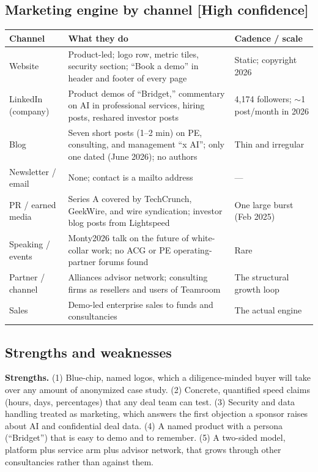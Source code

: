 \documentclass[11pt]{article}
\newcommand{\high}{\textcolor{green!45!black}{\textbf{[High confidence]}}}
\begin{document}
\subsection{Marketing engine by channel \high}
\begin{center}
\renewcommand{\arraystretch}{1.25}
\small
\begin{tabular}{R{2.6cm} R{6.4cm} R{4.2cm}}
\toprule
\textbf{Channel} & \textbf{What they do} & \textbf{Cadence / scale} \\
\midrule
Website & Product-led; logo row, metric tiles, security section; ``Book a demo'' in
header and footer of every page & Static; copyright 2026 \\
LinkedIn (company) & Product demos of ``Bridget,'' commentary on AI in professional
services, hiring posts, reshared investor posts & 4,174 followers; $\sim$1 post/month
in 2026 \\
Blog & Seven short posts (1--2 min) on PE, consulting, and management ``x AI''; only one
dated (June 2026); no authors & Thin and irregular \\
Newsletter / email & None; contact is a mailto address & --- \\
PR / earned media & Series A covered by TechCrunch, GeekWire, and wire syndication;
investor blog posts from Lightspeed & One large burst (Feb 2025) \\
Speaking / events & Monty2026 talk on the future of white-collar work; no ACG or PE
operating-partner forums found & Rare \\
Partner / channel & Alliances advisor network; consulting firms as resellers and
users of Teamroom & The structural growth loop \\
Sales & Demo-led enterprise sales to funds and consultancies & The actual engine \\
\bottomrule
\end{tabular}
\end{center}

\subsection{Strengths and weaknesses}
\textbf{Strengths.} (1) Blue-chip, named logos, which a diligence-minded buyer will take
over any amount of anonymized case study. (2) Concrete, quantified speed claims
(hours, days, percentages) that any deal team can test. (3) Security and data handling
treated as marketing, which answers the first objection a sponsor raises about AI and
confidential deal data. (4) A named product with a persona (``Bridget'') that is easy
to demo and to remember. (5) A two-sided model, platform plus service arm plus advisor
network, that grows through other consultancies rather than against them.
\end{document}
